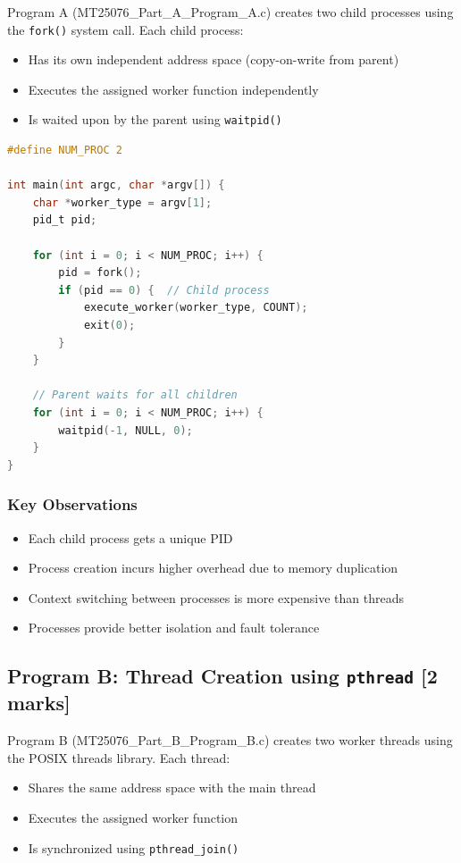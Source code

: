 \documentclass[12pt,a4paper]{article}
\begin{document}
Program A (MT25076\_Part\_A\_Program\_A.c) creates two child processes using the \texttt{fork()} system call.
Each child process:
\begin{itemize}
    \item Has its own independent address space (copy-on-write from parent)
    \item Executes the assigned worker function independently
    \item Is waited upon by the parent using \texttt{waitpid()}
\end{itemize}

\begin{lstlisting}[language=C, caption=Program A - Key Implementation]
#define NUM_PROC 2

int main(int argc, char *argv[]) {
    char *worker_type = argv[1];
    pid_t pid;
    
    for (int i = 0; i < NUM_PROC; i++) {
        pid = fork();
        if (pid == 0) {  // Child process
            execute_worker(worker_type, COUNT);
            exit(0);
        }
    }
    
    // Parent waits for all children
    for (int i = 0; i < NUM_PROC; i++) {
        waitpid(-1, NULL, 0);
    }
}
\end{lstlisting}

\subsubsection{Key Observations}
\begin{itemize}
    \item Each child process gets a unique PID
    \item Process creation incurs higher overhead due to memory duplication
    \item Context switching between processes is more expensive than threads
    \item Processes provide better isolation and fault tolerance
\end{itemize}

\subsection{Program B: Thread Creation using \texttt{pthread} [2 marks]}

Program B (MT25076\_Part\_B\_Program\_B.c) creates two worker threads using the POSIX threads library.
Each thread:
\begin{itemize}
    \item Shares the same address space with the main thread
    \item Executes the assigned worker function
    \item Is synchronized using \texttt{pthread\_join()}
\end{itemize}
\end{document}
